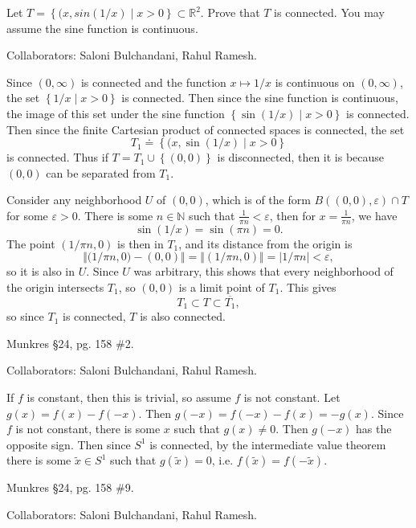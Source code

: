 \documentclass[10pt]{report}
\begin{document}
\begin{exer}[]
	Let $T = \left\{ (x,sin(1/x) \;|\; x>0 \right\} \subset \mathbb{R}^2$. Prove that $T$ is connected. You may assume the sine function is continuous.
\end{exer}
{\color{blue}Collaborators: Saloni Bulchandani, Rahul Ramesh.}

Since $(0,\infty)$ is connected and the function $x \mapsto 1/x$ is continuous on $(0,\infty)$, the set $\left\{ 1/x \;|\; x>0 \right\}$ is connected. Then since the sine function is continuous, the image of this set under the sine function $\left\{ \sin\left( 1/x \right)\;|\; x > 0 \right\}$ is connected. Then since the finite Cartesian product of connected spaces is connected, the set
\[
	T_1 \doteq \left\{ (x,\sin\left( 1/x \right)\;|\; x > 0 \right\}
\] is connected. Thus if $T = T_1 \cup \left\{ (0,0) \right\}$ is disconnected, then it is because $(0,0)$ can be separated from $T_1$.

Consider any neighborhood $U$ of $(0,0)$, which is of the form $B( (0,0), \varepsilon) \cap T$ for some $\varepsilon>0$. There is some $n \in \mathbb{N}$ such that $\frac{1}{\pi n} <\varepsilon$, then for $x = \frac{1}{\pi n} $, we have
\[
	\sin\left( 1/x \right) = \sin(\pi n) = 0.
\] The point $(1/\pi n, 0)$ is then in $T_1$, and its distance from the origin is
\[
	{\Vert{(1/\pi n},0)-(0,0)\Vert} = {\Vert{(1/\pi n,0)}\Vert}=|1/\pi n| < \varepsilon,
\]so it is also in $U$. Since $U$ was arbitrary, this shows that every neighborhood of the origin intersects $T_1$, so $(0,0)$ is a limit point of $T_1$. This gives
\[
T_1 \subset T \subset \overline{T_1},
\] so since $T_1$ is connected, $T$ is also connected.

\begin{exer}[]
Munkres \S 24, pg. 158 \#2.
\end{exer}
{\color{blue}Collaborators: Saloni Bulchandani, Rahul Ramesh.}

If $f$ is constant, then this is trivial, so assume $f$ is not constant. Let $g(x) = f(x)-f(-x)$. Then $g(-x) = f(-x)-f(x)=-g(x)$. Since $f$ is not constant, there is some $x$ such that $g(x) \neq 0$. Then $g(-x)$ has the opposite sign. Then since $S^1$ is connected, by the intermediate value theorem there is some $\tilde{x} \in S^1$ such that $g(\tilde{x})=0$, i.e. $f(\tilde{x})=f(-\tilde{x})$.
\pagebreak

\begin{exer}[]
Munkres \S 24, pg. 158 \#9.
\end{exer}
{\color{blue}Collaborators: Saloni Bulchandani, Rahul Ramesh.}
\end{document}
